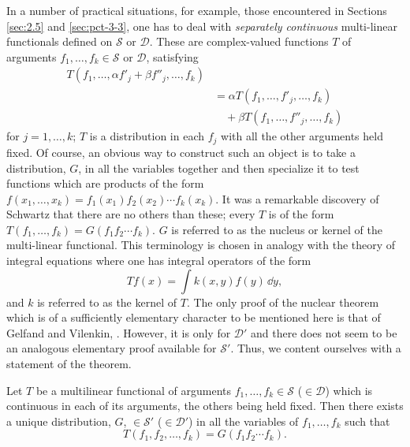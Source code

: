 In a number of practical situations, for example, those encountered in
Sections \ref{sec:2.5} and \ref{sec:pct-3-3}, one has to deal with \emph{separately continuous}
multi-linear functionals defined on $\mathcal{S}$ or $\mathcal{D}$. These are
complex-valued functions $T$ of arguments $f_1,\ldots,f_k\in\mathcal{S}$ or
$\mathcal{D}$, satisfying
\begin{equation}
\begin{aligned}
  T(f_1,\ldots,\alpha f'_j+\beta f''_j,\ldots,f_k)
  \\
   &={ }\alpha T(f_1,\ldots,f'_j,\ldots,f_k)\\
   &\quad+\beta T(f_1,\ldots,f''_j,\ldots,f_k)
\end{aligned}
\tag{2-32}\label{eq:ch2-separately-linear}
\end{equation}
for $j=1,\ldots,k$; $T$ is a distribution in each $f_j$ with all the other
arguments held fixed. Of course, an obvious way to construct such an object is
to take a distribution, $G$, in all the variables together and then specialize
it to test functions which are products of the form
$f(x_1,\ldots,x_k)=f_1(x_1)f_2(x_2)\cdots f_k(x_k)$. It was a remarkable
discovery of Schwartz that there are no others than these; every $T$ is of the
form $T(f_1,\ldots,f_k)=G(f_1f_2\cdots f_k)$. $G$ is referred to as the
nucleus or kernel of the multi-linear functional. This terminology is chosen
in analogy with the theory of integral equations where one has integral
operators of the form
\begin{equation*}
  Tf(x)=\int k(x,y)f(y)\,\dd y,
\end{equation*}
and $k$ is referred to as the kernel of $T$. The only proof of the nuclear
theorem which is of a sufficiently
elementary character to be mentioned here is that of Gelfand and Vilenkin,
\cite{pct-5}. However, it is only for $\mathcal{D}'$ and there does not seem to be
an analogous elementary proof available for $\mathcal{S}'$. Thus, we
content ourselves with a statement of the theorem.

\begin{theorem}\label{thm:ch2-nuclear}
Let $T$ be a multilinear functional of arguments
$f_1,\ldots,f_k\in\mathcal{S}$ ($\in\mathcal{D}$) which is continuous in
each of its arguments, the others being held fixed. Then there exists a
unique distribution, $G$, $\in\mathcal{S}'$ ($\in\mathcal{D}'$) in all the
variables of $f_1,\ldots,f_k$ such that
\begin{equation*}
  T(f_1,f_2,\ldots,f_k)=G(f_1f_2\cdots f_k).
\end{equation*}
\end{theorem}

